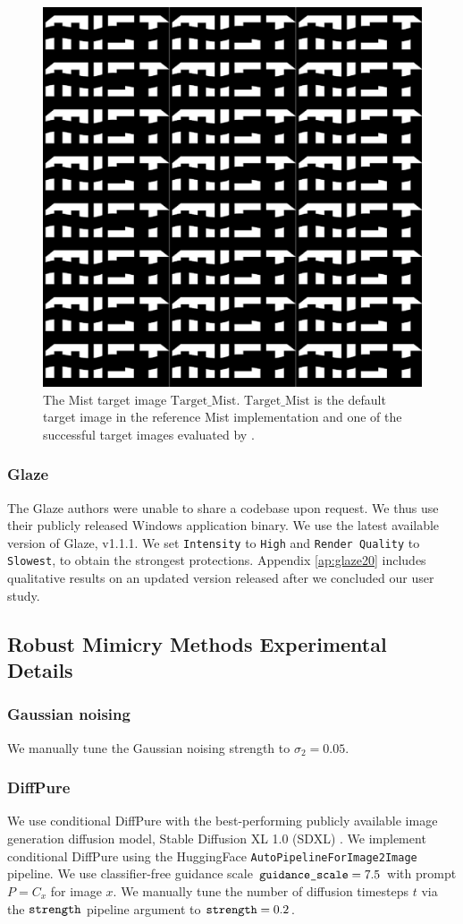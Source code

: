 \documentclass{article}
\begin{document}
\begin{figure}[htbp]
\centering
\includegraphics[width=0.3\linewidth]{media/Target_Mist.png}
\caption{The Mist target image $\text{Target\_Mist}$. $\text{Target\_Mist}$ is the default target image in the reference Mist implementation and one of the successful target images evaluated by \citeauthor{misttechnical}.}
\label{fig:targetmist}
\end{figure}

\subsubsection{Glaze}
\label{sec:glazeexp}
The Glaze authors were unable to share a codebase upon request. We thus use their publicly released Windows application binary. We use the latest available version of Glaze, v1.1.1. We set \texttt{Intensity} to \texttt{High} and \texttt{Render Quality} to \texttt{Slowest}, to obtain the strongest protections. Appendix \ref{ap:glaze20} includes qualitative results on an updated version released after we concluded our user study.

\subsection{Robust Mimicry Methods Experimental Details}

\subsubsection{Gaussian noising}
\label{sec:gaussiannoisingexp}
We manually tune the Gaussian noising strength to $\sigma_2 = 0.05$. 

\subsubsection{DiffPure}
\label{sec:diffpureexp}
We use conditional DiffPure with the best-performing publicly available image generation diffusion model, Stable Diffusion XL 1.0 (SDXL) \citep{sdxl}. We implement conditional DiffPure using the HuggingFace \texttt{AutoPipelineForImage2Image} pipeline. We use classifier-free guidance scale $\text{\texttt{guidance\_scale}} = 7.5$ with prompt $P = C_x$ for image $x$.
We manually tune the number of diffusion timesteps $t$ via the $\text{\texttt{strength}}$ pipeline argument to $\text{\texttt{strength}} = 0.2$.
\end{document}
